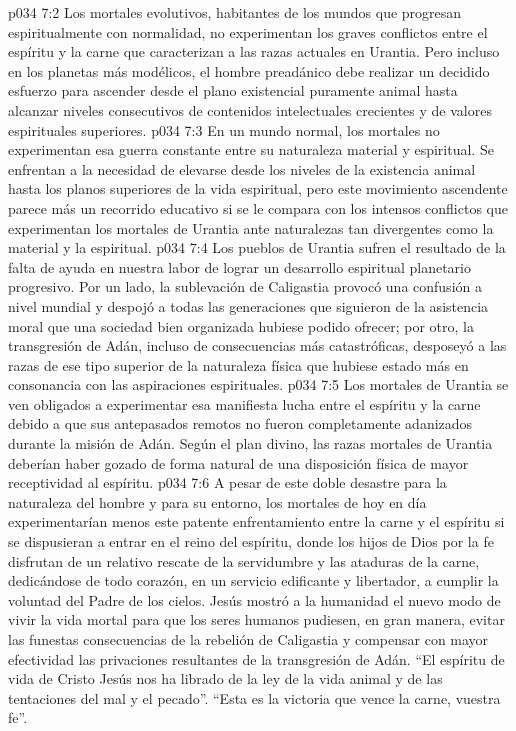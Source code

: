 \vs p034 7:2 Los mortales evolutivos, habitantes de los mundos que progresan espiritualmente con normalidad, no experimentan los graves conflictos entre el espíritu y la carne que caracterizan a las razas actuales en Urantia. Pero incluso en los planetas más modélicos, el hombre preadánico debe realizar un decidido esfuerzo para ascender desde el plano existencial puramente animal hasta alcanzar niveles consecutivos de contenidos intelectuales crecientes y de valores espirituales superiores.
\vs p034 7:3 En un mundo normal, los mortales no experimentan esa guerra constante entre su naturaleza material y espiritual. Se enfrentan a la necesidad de elevarse desde los niveles de la existencia animal hasta los planos superiores de la vida espiritual, pero este movimiento ascendente parece más un recorrido educativo si se le compara con los intensos conflictos que experimentan los mortales de Urantia ante naturalezas tan divergentes como la material y la espiritual.
\vs p034 7:4 \pc Los pueblos de Urantia sufren el resultado de la falta de ayuda en nuestra labor de lograr un desarrollo espiritual planetario progresivo. Por un lado, la sublevación de Caligastia provocó una confusión a nivel mundial y despojó a todas las generaciones que siguieron de la asistencia moral que una sociedad bien organizada hubiese podido ofrecer; por otro, la transgresión de Adán, incluso de consecuencias más catastróficas, desposeyó a las razas de ese tipo superior de la naturaleza física que hubiese estado más en consonancia con las aspiraciones espirituales.
\vs p034 7:5 Los mortales de Urantia se ven obligados a experimentar esa manifiesta lucha entre el espíritu y la carne debido a que sus antepasados remotos no fueron completamente adanizados durante la misión de Adán. Según el plan divino, las razas mortales de Urantia deberían haber gozado de forma natural de una disposición física de mayor receptividad al espíritu.
\vs p034 7:6 \pc A pesar de este doble desastre para la naturaleza del hombre y para su entorno, los mortales de hoy en día experimentarían menos este patente enfrentamiento entre la carne y el espíritu si se dispusieran a entrar en el reino del espíritu, donde los hijos de Dios por la fe disfrutan de un relativo rescate de la servidumbre y las ataduras de la carne, dedicándose de todo corazón, en un servicio edificante y libertador, a cumplir la voluntad del Padre de los cielos. Jesús mostró a la humanidad el nuevo modo de vivir la vida mortal para que los seres humanos pudiesen, en gran manera, evitar las funestas consecuencias de la rebelión de Caligastia y compensar con mayor efectividad las privaciones resultantes de la transgresión de Adán. “El espíritu de vida de Cristo Jesús nos ha librado de la ley de la vida animal y de las tentaciones del mal y el pecado”. “Esta es la victoria que vence la carne, vuestra fe”.

